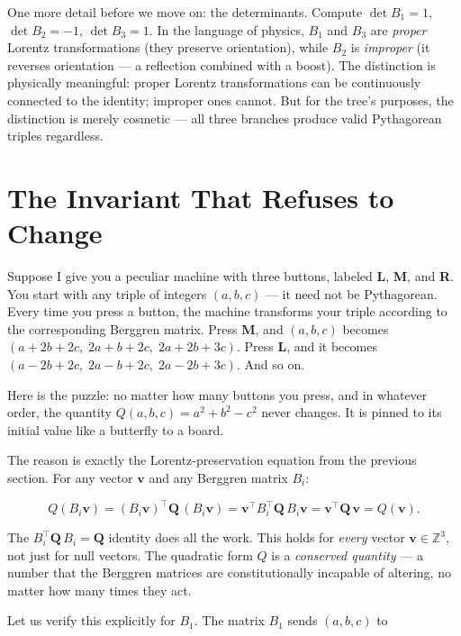 \documentclass[11pt,twoside,openright]{book}
\theoremstyle{definition}
\theoremstyle{remark}
\begin{document}
One more detail before we move on: the determinants. Compute $\det B_1 = 1$, $\det B_2 = -1$, $\det B_3 = 1$. In the language of physics, $B_1$ and $B_3$ are \textit{proper} Lorentz transformations (they preserve orientation), while $B_2$ is \textit{improper} (it reverses orientation --- a reflection combined with a boost). The distinction is physically meaningful: proper Lorentz transformations can be continuously connected to the identity; improper ones cannot. But for the tree's purposes, the distinction is merely cosmetic --- all three branches produce valid Pythagorean triples regardless.



\section{The Invariant That Refuses to Change}

Suppose I give you a peculiar machine with three buttons, labeled \textbf{L}, \textbf{M}, and \textbf{R}. You start with any triple of integers $(a, b, c)$ --- it need not be Pythagorean. Every time you press a button, the machine transforms your triple according to the corresponding Berggren matrix. Press \textbf{M}, and $(a, b, c)$ becomes $(a + 2b + 2c,\; 2a + b + 2c,\; 2a + 2b + 3c)$. Press \textbf{L}, and it becomes $(a - 2b + 2c,\; 2a - b + 2c,\; 2a - 2b + 3c)$. And so on.

Here is the puzzle: no matter how many buttons you press, and in whatever order, the quantity $Q(a, b, c) = a^2 + b^2 - c^2$ never changes. It is pinned to its initial value like a butterfly to a board.

The reason is exactly the Lorentz-preservation equation from the previous section. For any vector $\mathbf{v}$ and any Berggren matrix $B_i$:

\[Q(B_i \mathbf{v}) = (B_i \mathbf{v})^\top \mathbf{Q}\, (B_i \mathbf{v}) = \mathbf{v}^\top B_i^\top \mathbf{Q}\, B_i \mathbf{v} = \mathbf{v}^\top \mathbf{Q}\, \mathbf{v} = Q(\mathbf{v}).\]

The $B_i^\top \mathbf{Q} \, B_i = \mathbf{Q}$ identity does all the work. This holds for \textit{every} vector $\mathbf{v} \in \mathbb{Z}^3$, not just for null vectors. The quadratic form $Q$ is a \textit{conserved quantity} --- a number that the Berggren matrices are constitutionally incapable of altering, no matter how many times they act.

Let us verify this explicitly for $B_1$. The matrix $B_1$ sends $(a, b, c)$ to
\end{document}
